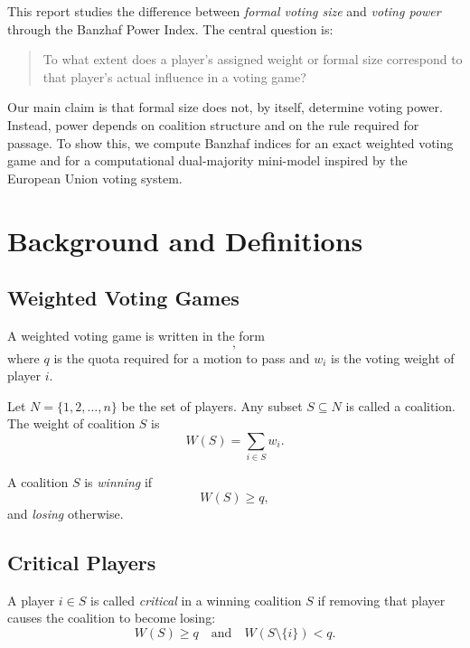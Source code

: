 \documentclass[lettersize,journal]{IEEEtran}
\begin{document}
This report studies the difference between \emph{formal voting size} and \emph{voting power} through the Banzhaf Power Index. The central question is:

\begin{quote}
To what extent does a player's assigned weight or formal size correspond to that player's actual influence in a voting game?
\end{quote}

Our main claim is that formal size does not, by itself, determine voting power. Instead, power depends on coalition structure and on the rule required for passage. To show this, we compute Banzhaf indices for an exact weighted voting game and for a computational dual-majority mini-model inspired by the European Union voting system.

\section{Background and Definitions}

\subsection{Weighted Voting Games}
A weighted voting game is written in the form
\begin{equation}
[q:w_1,w_2,\dots,w_n],
\end{equation}
where $q$ is the quota required for a motion to pass and $w_i$ is the voting weight of player $i$.

Let $N=\{1,2,\dots,n\}$ be the set of players. Any subset $S\subseteq N$ is called a coalition. The weight of coalition $S$ is
\begin{equation}
W(S)=\sum_{i\in S} w_i.
\end{equation}

A coalition $S$ is \emph{winning} if
\begin{equation}
W(S)\ge q,
\end{equation}
and \emph{losing} otherwise.

\subsection{Critical Players}
A player $i\in S$ is called \emph{critical} in a winning coalition $S$ if removing that player causes the coalition to become losing:
\begin{equation}
W(S)\ge q
\quad \text{and} \quad
W(S\setminus\{i\})<q.
\end{equation}
\end{document}
